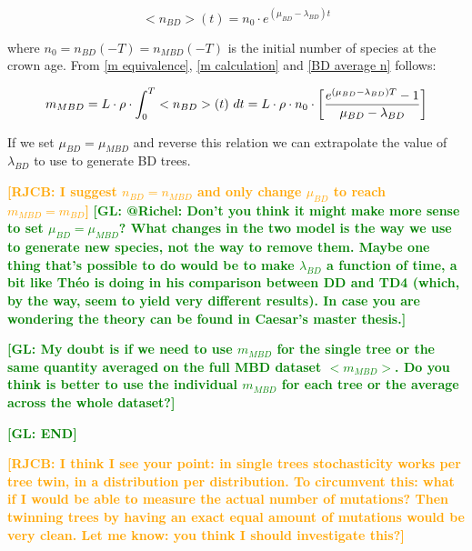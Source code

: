 \documentclass{article}
\newcommand*\richel[1]{\textcolor{orange}{\textbf{[RJCB: #1]}}}
\newcommand*\gio[1]{\textcolor{green}{\textbf{[GL: #1]}}}
\begin{document}
\begin{equation}
    <n_{BD}>(t) = n_{0} \cdot e^{(\mu_{BD} - \lambda_{BD})t} \label{BD average n}
\end{equation}

where $n_{0} = n_{BD}(-T) = n_{MBD}(-T)$ is the initial number of species at the crown age.
From \ref{m equivalence}, \ref{m calculation} and \ref{BD average n} follows:

\begin{equation}
m_{MBD} = L \cdot \rho \cdot \int_{0}^{T} <n_{BD}>(t)\ dt \\
= L \cdot \rho \cdot n_{0} \cdot \left[ \frac{e^{(\mu_{BD} - \lambda_{BD})T} - 1}{\mu_{BD} - \lambda_{BD}} \right]
\end{equation}

If we set $\mu_{BD} = \mu_{MBD}$ and reverse this relation we can extrapolate the value of $\lambda_{BD}$ to use to generate BD trees.

\richel{I suggest $n_{BD} = n_{MBD}$ and only 
change $\mu_{BD}$ to reach $m_{MBD} = m_{BD}$}
\gio{@Richel: Don't you think it might make more sense to set $\mu_{BD} = \mu_{MBD}$? What changes in the two model is the way we use to generate new species, not the way to remove them. Maybe one thing that's possible to do would be to make $\lambda_{BD}$ a function of time, a bit like Théo is doing in his comparison between DD and TD4 (which, by the way, seem to yield very different results). In case you are wondering the theory can be found in Caesar's master thesis.}





\gio{My doubt is if we need to use $m_{MBD}$ for the single tree or the same
quantity averaged on the full MBD dataset $<m_{MBD}>$.
Do you think is better to use the
individual $m_{MBD}$ for each tree or the average across the whole
dataset?}

\gio{END}

\richel{I think I see your point: in single trees stochasticity works per tree twin, in a distribution per distribution. To circumvent this: what if I would be 
able to measure the actual number of mutations? Then twinning trees by
having an exact equal amount of mutations would be very clean. Let me know: 
you think I should investigate this?}

\end{document}
